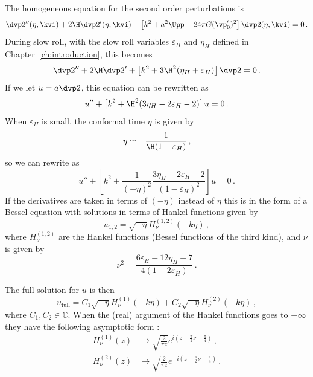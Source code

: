 The homogeneous equation for the second order perturbations is  
% 
\begin{equation}
\label{eq:homogen-corr}
 \dvp2''(\eta, \kvi) + 2\H \dvp2'(\eta, \kvi) 
+ \left[ k^2 + a^2\Upp - 24\pi G (\vp_0')^2 \right]\dvp2(\eta,\kvi) = 0\,.
\end{equation}
% 
During slow roll, with the slow roll variables $\varepsilon_H$ and $\eta_H$ defined in
Chapter~\ref{ch:introduction}, this becomes
% 
\begin{equation}
 \dvp2'' + 2\H \dvp2' + \left[k^2 + 3\H^2(\eta_H + \varepsilon_H)\right]\dvp2 = 0\,.
\end{equation}
% 
If we let $u=a\dvp2$, this equation can be rewritten as
% 
\begin{equation}
\label{eq:uH-corr}
 u'' + \left[k^2 +\H^2(3\eta_H - 2\varepsilon_H - 2)\right]u = 0\,.
\end{equation}
% 
When $\varepsilon_H$ is small, the conformal time $\eta$ is given by 
% 
\begin{equation}
 \eta \simeq -\frac{1}{\H(1-\varepsilon_H)}\,,
\end{equation}
% 
so we can rewrite  as
% 
\begin{equation}
 u'' + \left[k^2 + \frac{1}{(-\eta)^2}\frac{3\eta_H -2\varepsilon_H -2}{(1-\varepsilon_H)^2} 
       \right]u = 0\,.
\end{equation}
% 
If the derivatives are taken in terms of $(-\eta)$ instead of $\eta$ this is in the form of a
Bessel equation with solutions in terms of Hankel functions given by
% 
\begin{equation}
 u_{1,2} = \sqrt{-\eta} H_\nu^{(1,2)}(-k\eta)\,, 
\end{equation}
% 
where $H_\nu^{(1,2)}$ are the Hankel functions (Bessel functions of the third kind), and $\nu$ is
given by
% 
\begin{equation}
 \nu^2 = \frac{6\varepsilon_H -12\eta_H + 7}{4(1-2\varepsilon_H)}\,.
\end{equation}
%

The full solution for $u$ is then
% 
\begin{equation}
 u_\mathrm{full} = C_1 \sqrt{-\eta} H_\nu^{(1)}(-k\eta) +
                   C_2 \sqrt{-\eta} H_\nu^{(2)}(-k\eta)\,,
\end{equation}
% 
where $C_1, C_2\in \mathbb{C}$. When the (real) argument of the Hankel functions goes to $+\infty$
they have the following asymptotic form \cite{abramowitz+stegun}:
% 
\begin{align}
 H_\nu^{(1)}(z) &\rightarrow \sqrt{\frac{2}{\pi z}} e^{i(z-\frac{\pi}{2}\nu - \frac{\pi}{4})} \,,\\
 H_\nu^{(2)}(z) &\rightarrow \sqrt{\frac{2}{\pi z}} e^{-i(z-\frac{\pi}{2}\nu - \frac{\pi}{4})} \,.
\end{align}
% 

